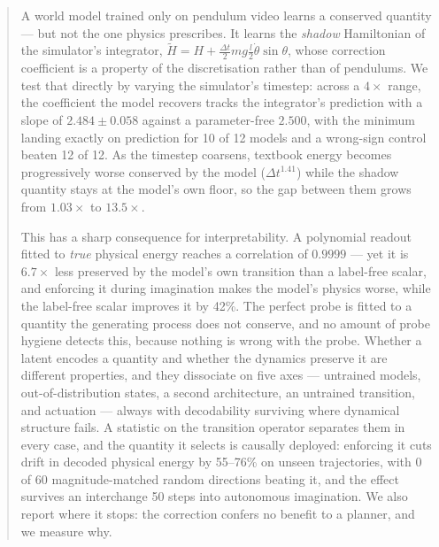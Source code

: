 \begin{abstract}
A world model trained only on pendulum video learns a conserved quantity --- but not the one physics
prescribes. It learns the \emph{shadow} Hamiltonian of the simulator's integrator,
$\tilde H = H + \tfrac{\Delta t}{2}mg\tfrac{l}{2}\dot\theta\sin\theta$, whose correction coefficient
is a property of the discretisation rather than of pendulums. We test that directly by varying the
simulator's timestep: across a $4\times$ range, the coefficient the model recovers tracks the
integrator's prediction with a slope of $2.484 \pm 0.058$ against a parameter-free $2.500$, with the
minimum landing exactly on prediction for 10 of 12 models and a wrong-sign control beaten 12 of 12.
As the timestep coarsens, textbook energy becomes progressively worse conserved by the model
($\Delta t^{1.41}$) while the shadow quantity stays at the model's own floor, so the gap between them
grows from $1.03\times$ to $13.5\times$.

This has a sharp consequence for interpretability. A polynomial readout fitted to \emph{true} physical
energy reaches a correlation of $0.9999$ --- yet it is $6.7\times$ less preserved by the model's own
transition than a label-free scalar, and enforcing it during imagination makes the model's physics
worse, while the label-free scalar improves it by 42\%. The perfect probe is fitted to a quantity the
generating process does not conserve, and no amount of probe hygiene detects this, because nothing is
wrong with the probe. Whether a latent encodes a quantity and whether the dynamics preserve it are
different properties, and they dissociate on five axes --- untrained models, out-of-distribution
states, a second architecture, an untrained transition, and actuation --- always with decodability
surviving where dynamical structure fails. A statistic on the transition operator separates them in
every case, and the quantity it selects is causally deployed: enforcing it cuts drift in decoded
physical energy by 55--76\% on unseen trajectories, with 0 of 60 magnitude-matched random directions
beating it, and the effect survives an interchange 50 steps into autonomous imagination. We also
report where it stops: the correction confers no benefit to a planner, and we measure why.
\end{abstract}
